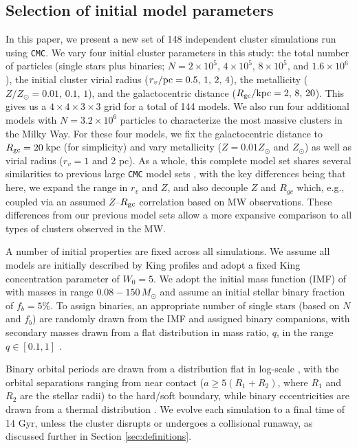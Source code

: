 \documentclass[twocolumn,tighten]{aastex63}
\begin{document}
\subsection{Selection of initial model parameters}
\label{sec:model_params}

In this paper, we present a new set of 148 independent cluster simulations run using \texttt{CMC}. We vary four initial cluster parameters in this study: the total number of particles (single stars plus binaries; $N=2\times10^5$, $4\times10^5$, $8\times10^5$, and $1.6\times10^6$), the initial cluster virial radius ($r_v/\rm{pc}=0.5,\,1,\,2,\,4$), the metallicity ($Z/Z_\odot=0.01,\,0.1,\,1$), and the galactocentric distance ($R_{\rm{gc}}/\rm{kpc}=2,\,8,\,20$).
This gives us a $4\times4\times3\times3$ grid for a total of 144 models. We also run four additional models with $N=3.2\times10^6$ particles to characterize the most massive clusters in the Milky Way. For these four models, we fix the galactocentric distance to $R_{\rm{gc}}=20\,$kpc (for simplicity) and vary metallicity ($Z=0.01Z_{\odot}$ and $Z_{\odot}$) as well as virial radius ($r_v=1$ and 2 pc).
As a whole, this complete model set shares several similarities to previous large \texttt{CMC} model sets \citep[e.g.,][]{Chatterjee2010,Chatterjee2013a,Morscher2015,Rodriguez2018a}, with the key differences being that here, we expand the range in $r_v$ and $Z$, and also decouple $Z$ and $R_{gc}$ which, e.g., \citet{Morscher2015} coupled via an assumed $Z$--$R_{\rm{gc}}$ correlation based on MW observations. These differences from our previous model sets allow a more expansive comparison to all types of clusters observed in the MW. 

A number of initial properties are fixed across all simulations. We assume all models are initially described by King profiles \citep{King1962} and adopt a fixed King concentration parameter of $W_0 = 5$. We adopt the initial mass function (IMF) of \citet{Kroupa2001} with masses in range $0.08-150\,M_{\odot}$ and assume an initial stellar binary fraction of $f_b=5\%$. To assign binaries, an appropriate number of single stars (based on $N$ and $f_b$) are randomly drawn from the IMF and assigned binary companions, with secondary masses drawn from a flat distribution in mass ratio, $q$, in the range $q \in [0.1,1]$ \citep[e.g.,][]{DuquennoyMayor1991}. 

Binary orbital periods are drawn from a distribution flat in log-scale \citep[e.g.,][]{DuquennoyMayor1991}, with the orbital separations ranging from near contact ($a \geq 5(R_1+R_2)$, where $R_1$ and $R_2$ are the stellar radii) to the hard/soft boundary, while  binary eccentricities are drawn from a thermal distribution \citep[e.g.,][]{Heggie1975}.
We evolve each simulation to a final time of 14 Gyr, unless the cluster disrupts or undergoes a collisional runaway, as discussed further in Section \ref{sec:definitions}.
\end{document}
